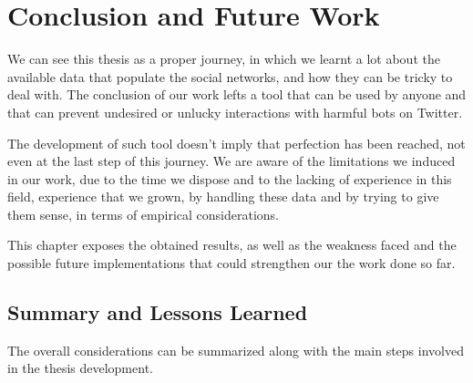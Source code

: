 \chapter{Conclusion and Future Work}
\label{capitolo8}
\thispagestyle{empty}

We can see this thesis as a proper journey, in which we learnt a lot about the available data that populate the social networks, and how they can be tricky to deal with.
The conclusion of our work lefts a tool that can be used by anyone and that can prevent undesired or unlucky interactions with harmful bots on Twitter.

The development of such tool doesn't imply that perfection has been reached, not even at the last step of this journey. We are aware of the limitations we induced in our work, due to the time we dispose and to the lacking of experience in this field, experience that we grown, by handling these data and by trying to give them sense, in terms of empirical considerations. 

This chapter exposes the obtained results, as well as the weakness faced and the possible future implementations that could strengthen our the work done so far.

\section{Summary and Lessons Learned}
The overall considerations can be summarized along with the main steps involved in the thesis development.

